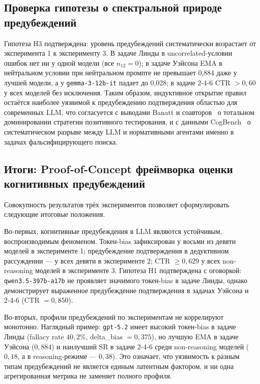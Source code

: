 \subsection{Проверка гипотезы о спектральной природе предубеждений}

Гипотеза H3 подтверждена: уровень предубеждений систематически возрастает от эксперимента 1 к эксперименту 3. В задаче Линды в uncorrelated-условии ошибок нет ни у одной модели (все $n_{12} = 0$); в задаче Уэйсона EMA в нейтральном условии при нейтральном промпте не превышает 0,884 даже у лучшей модели, а у \texttt{gemma-3-12b-it} падает до 0,028; в задаче 2-4-6 CTR $> 0{,}60$ у всех моделей без исключения. Таким образом, индуктивное открытие правил остаётся наиболее уязвимой к предубеждению подтверждения областью для современных LLM, что согласуется с выводами Banatt и соавторов~\cite{banatt2024wilt} о тотальном доминировании стратегии позитивного тестирования, и с данными CogBench~\cite{coda2024cogbench} о систематическом разрыве между LLM и нормативными агентами именно в задачах фальсифицирующего поиска.

\subsection{Итоги: Proof-of-Concept фреймворка оценки когнитивных предубеждений}

Совокупность результатов трёх экспериментов позволяет сформулировать следующие итоговые положения.

Во-первых, когнитивные предубеждения в LLM являются устойчивым, воспроизводимым феноменом. Токен-bias зафиксирован у восьми из девяти моделей в эксперименте 1; предубеждение подтверждения в дедуктивном рассуждении --- у всех девяти в эксперименте 2; CTR $\geq 0{,}629$ у всех non-reasoning моделей в эксперименте 3. Гипотеза H1 подтверждена с оговоркой: \texttt{qwen3.5-397b-a17b} не проявляет значимого токен-bias в задаче Линды, однако демонстрирует выраженное предубеждение подтверждения в задачах Уэйсона и 2-4-6 (CTR $= 0{,}850$).

Во-вторых, профили предубеждений по экспериментам не коррелируют монотонно. Наглядный пример: \texttt{gpt-5.2} имеет высокий токен-bias в задаче Линды (fallacy rate $40{,}2\%$, delta\_bias $= 0{,}375$), но лучшую EMA в задаче Уэйсона ($0{,}884$) и наилучший SR в задаче 2-4-6 среди non-reasoning моделей ($0{,}18$, а в reasoning-режиме --- $0{,}38$). Это означает, что уязвимость к разным типам предубеждений не является единым латентным фактором, и ни одна агрегированная метрика не заменяет полного профиля.

